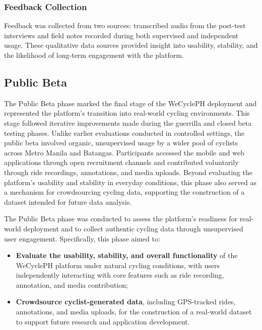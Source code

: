 \subsubsection{Feedback Collection}
Feedback was collected from two sources: transcribed audio from the post-test interviews and field notes recorded during both supervised and independent usage. These qualitative data sources provided insight into usability, stability, and the likelihood of long-term engagement with the platform.



\subsection{Public Beta}
The Public Beta phase marked the final stage of the WeCyclePH deployment and represented the platform’s transition into real-world cycling environments. This stage followed iterative improvements made during the guerrilla and closed beta testing phases. Unlike earlier evaluations conducted in controlled settings, the public beta involved organic, unsupervised usage by a wider pool of cyclists across Metro Manila and Batangas. Participants accessed the mobile and web applications through open recruitment channels and contributed voluntarily through ride recordings, annotations, and media uploads. Beyond evaluating the platform’s usability and stability in everyday conditions, this phase also served as a mechanism for crowdsourcing cycling data, supporting the construction of a dataset intended for future data analysis.

The Public Beta phase was conducted to assess the platform’s readiness for real-world deployment and to collect authentic cycling data through unsupervised user engagement. Specifically, this phase aimed to:
\begin{itemize}
    \item \textbf{Evaluate the usability, stability, and overall functionality} of the WeCyclePH platform under natural cycling conditions, with users independently interacting with core features such as ride recording, annotation, and media contribution;
    \item \textbf{Crowdsource cyclist-generated data}, including GPS-tracked rides, annotations, and media uploads, for the construction of a real-world dataset to support future research and application development.
\end{itemize}



